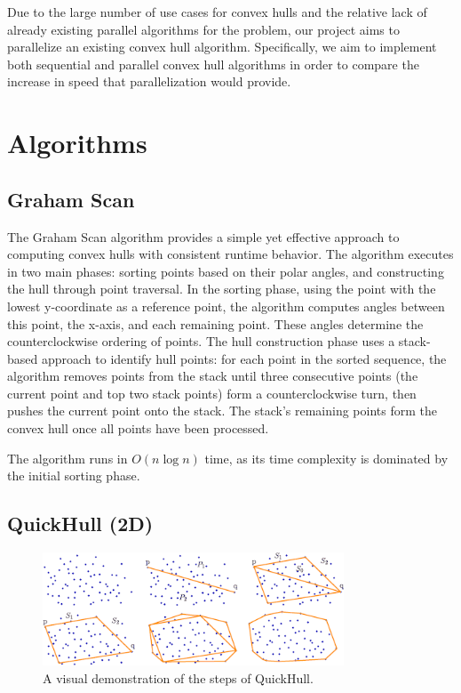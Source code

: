 \documentclass[12pt]{article}
\begin{document}
    Due to the large number of use cases for convex hulls and the relative lack of already existing parallel algorithms for the problem, our project aims to parallelize an existing convex hull algorithm. Specifically, we aim to implement both sequential and parallel convex hull algorithms in order to compare the increase in speed that parallelization would provide.
  \section{Algorithms} 

  \subsection*{Graham Scan}

    The Graham Scan algorithm provides a simple yet effective approach to computing convex hulls with consistent runtime behavior. The algorithm executes in two main phases: sorting points based on their polar angles, and constructing the hull through point traversal. In the sorting phase, using the point with the lowest y-coordinate as a reference point, the algorithm computes angles between this point, the x-axis, and each remaining point. These angles determine the counterclockwise ordering of points. The hull construction phase uses a stack-based approach to identify hull points: for each point in the sorted sequence, the algorithm removes points from the stack until three consecutive points (the current point and top two stack points) form a counterclockwise turn, then pushes the current point onto the stack. The stack's remaining points form the convex hull once all points have been processed.

    The algorithm runs in $O(n\log n)$ time, as its time complexity is dominated by the initial sorting phase.

  \subsection*{QuickHull (2D)}

  \begin{figure}[h]
    \centering
    \includegraphics[width=0.8\textwidth]{quick_hull_2d.png}
    \caption{A visual demonstration of the steps of QuickHull.}
  \end{figure}
\end{document}
